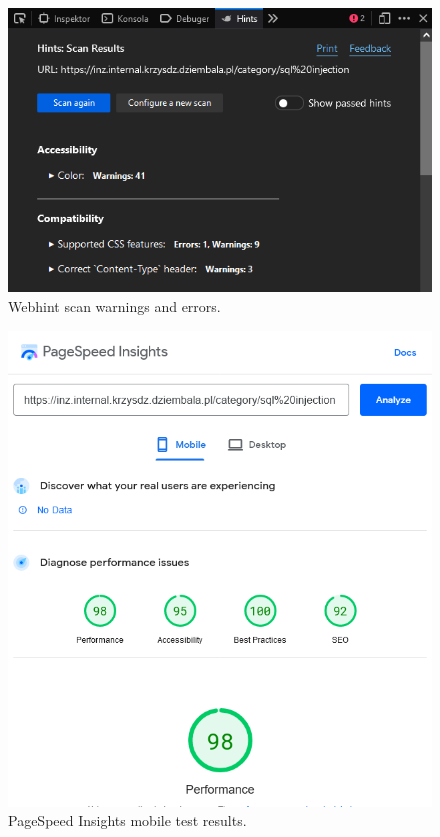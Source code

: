 \begin{figure}
	\centering
	\includegraphics{img/verify-webhint.png}
	\caption{Webhint scan warnings and errors.}
	\label{fig:verify-webhint}
\end{figure}

\begin{figure}
	\centering
	\includegraphics[width=\textwidth]{img/verify-performance-mobile.png}
	\caption{PageSpeed Insights mobile test results.}
	\label{fig:verify-perf}
\end{figure}

